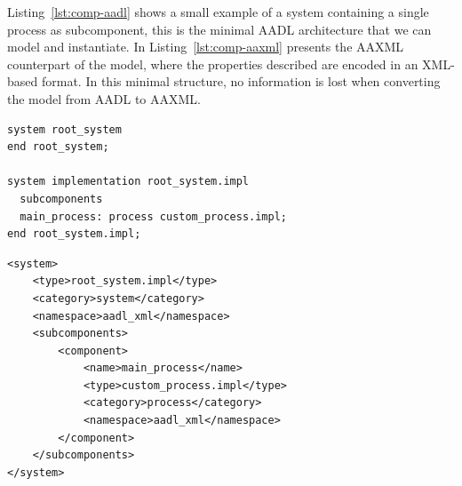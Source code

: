 Listing~\ref{lst:comp-aadl} shows a small example of a system containing a single process as subcomponent, this is the minimal AADL architecture that we can model and instantiate. In Listing~\ref{lst:comp-aaxml} presents the AAXML counterpart of the model, where the properties described are encoded in an XML-based format. In this minimal structure, no information is lost when converting the model from AADL to AAXML.

\begin{lstlisting}[frame=tb,caption={TODO caption},label=lst:comp-aadl]
system root_system
end root_system;

system implementation root_system.impl
  subcomponents
  main_process: process custom_process.impl;
end root_system.impl;
\end{lstlisting}

\begin{lstlisting}[frame=tb,caption={TODO caption},label=lst:comp-aaxml]
<system>
	<type>root_system.impl</type>
	<category>system</category>
	<namespace>aadl_xml</namespace>
	<subcomponents>
		<component>
			<name>main_process</name>
			<type>custom_process.impl</type>
			<category>process</category>
			<namespace>aadl_xml</namespace>
		</component>
	</subcomponents>
</system>
\end{lstlisting}

